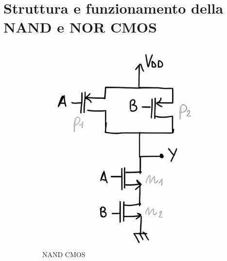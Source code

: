 \section{Struttura e funzionamento della NAND e NOR CMOS}
\begin{figure}[H]
  \centering
  \begin{subfigure}[b]{0.45\textwidth}
      \centering
      \includegraphics[width=\linewidth]{images/2.2.2.1.png}
      \caption{NAND CMOS}
  \end{subfigure}
  \hfill
  \begin{subfigure}[b]{0.45\textwidth}
      \centering

\end{subfigure}
\end{figure}
